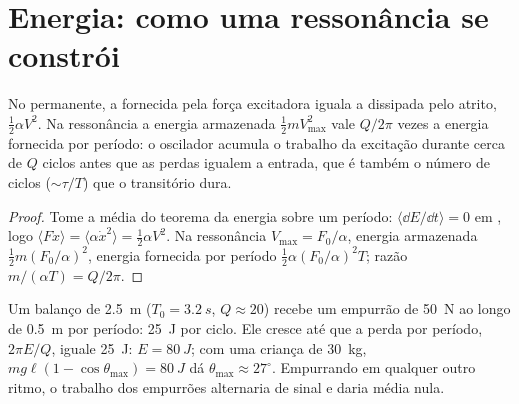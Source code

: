 \section{Energia: como uma ressonância se constrói}

\begin{proposition}\label{prop:b1:oscillators-resonance:energy}
No  permanente, a  fornecida pela força
excitadora iguala a  dissipada pelo atrito, $\tfrac12\alpha V^2$.
Na ressonância a energia armazenada $\tfrac12 mV_{\max}^2$ vale $Q/2\pi$ vezes
a energia fornecida por período: o oscilador acumula o trabalho da excitação
durante cerca de $Q$ ciclos antes que as perdas igualem a entrada, que é também
o número de ciclos ($\sim\tau/T$) que o transitório dura.
\end{proposition}

\begin{proof}
Tome a média do teorema da energia sobre um período: $\langle\dd E/\dd t\rangle = 0$
em , logo $\langle F\dot x\rangle = \langle\alpha\dot x^2\rangle =
\tfrac12\alpha V^2$. Na ressonância $V_{\max} = F_0/\alpha$, energia armazenada
$\tfrac12 m(F_0/\alpha)^2$, energia fornecida por período $\tfrac12\alpha(F_0/\alpha)^2T$;
razão $m/(\alpha T) = Q/2\pi$.
\end{proof}

\begin{example}[O balanço]\label{ex:b1:oscillators-resonance:swing}
Um balanço de \qty{2.5}{m} ($T_0 = \qty{3.2}{s}$, $Q \approx 20$) recebe
um empurrão de \qty{50}{N} ao longo de \qty{0.5}{m} por período: \qty{25}{J} por
ciclo. Ele cresce até que a perda por período, $2\pi E/Q$, iguale
\qty{25}{J}: $E = \qty{80}{J}$; com uma criança de \qty{30}{kg}, $mg\ell(1 -
\cos\theta_{\max}) = \qty{80}{J}$ dá $\theta_{\max} \approx 27^\circ$.
Empurrando em qualquer outro ritmo, o trabalho dos empurrões alternaria de
sinal e daria média nula.
\end{example}

